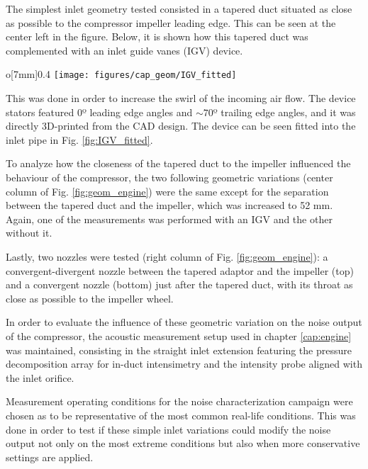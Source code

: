 The simplest inlet geometry tested consisted in a tapered duct situated as close as possible to the compressor impeller leading edge. This can be seen at the center left in the figure. Below, it is shown how this tapered duct was complemented with an inlet guide vanes (IGV) device.

\begin{wrapfigure}[15]{o}[7mm]{0.4\textwidth}
\centering
\texttt{[image: figures/cap\_geom/IGV\_fitted]}
\caption{Picture of the 3D-printed IGV device fitted to the compressor inlet duct, looking towards the impeller.}
\label{fig:IGV_fitted}
\end{wrapfigure}

This was done in order to increase the swirl of the incoming air flow. The device stators featured 0º leading edge angles and $\sim 70$º trailing edge angles, and it was directly 3D-printed from the CAD design. The device can be seen fitted into the inlet pipe in Fig. \ref{fig:IGV_fitted}.

To analyze how the closeness of the tapered duct to the impeller influenced the behaviour of the compressor, the two following geometric variations (center column of Fig. \ref{fig:geom_engine}) were the same except for the separation between the tapered duct and the impeller, which was increased to 52 mm. Again, one of the measurements was performed with an IGV and the other without it.

Lastly, two nozzles were tested (right column of Fig. \ref{fig:geom_engine}): a convergent-divergent nozzle between the tapered adaptor and the impeller (top) and a convergent nozzle (bottom) just after the tapered duct, with its throat as close as possible to the impeller wheel.

In order to evaluate the influence of these geometric variation on the noise output of the compressor, the acoustic measurement setup used in chapter \ref{cap:engine} was maintained, consisting in the straight inlet extension featuring the pressure decomposition array for in-duct intensimetry and the intensity probe aligned with the inlet orifice.

Measurement operating conditions for the noise characterization campaign were chosen as to be representative of the most common real-life conditions. This was done in order to test if these simple inlet variations could modify the noise output not only on the most extreme conditions but also when more conservative settings are applied.

